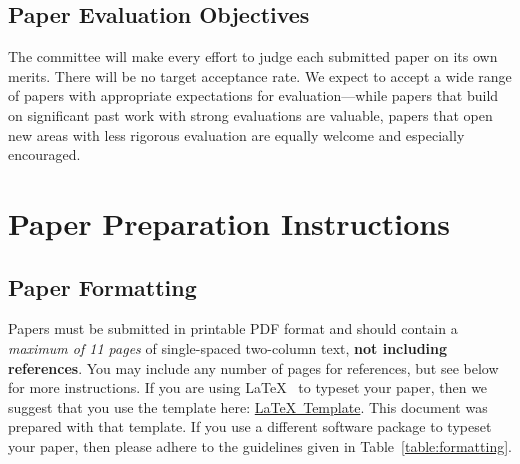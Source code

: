 \documentclass{sig-alternate}
\begin{document}
\subsection{Paper Evaluation Objectives}
The committee will make every effort to judge each submitted paper on its own merits. There will be no target acceptance rate. We expect to accept a wide range of papers with appropriate expectations for evaluation---while papers that build on significant past work with strong evaluations are valuable, papers that open new areas with less rigorous evaluation are equally welcome and especially encouraged.

\section{Paper Preparation Instructions}

\subsection{Paper Formatting}

Papers must be submitted in printable PDF format and should contain a {\em maximum of 11 pages} of single-spaced two-column text, {\bf not including references}.  You may include any number of pages for references, but see below for more instructions.  If you are using \LaTeX~\cite{lamport94} to typeset your paper, then we suggest that you use the template here: \href{https://www.microarch.org/micro53/submit/micro53-latex-template.zip}{\LaTeX~Template}. This document was prepared with that template.  If you use a different software package to typeset your paper, then please adhere to the guidelines given in Table~\ref{table:formatting}.
\end{document}
